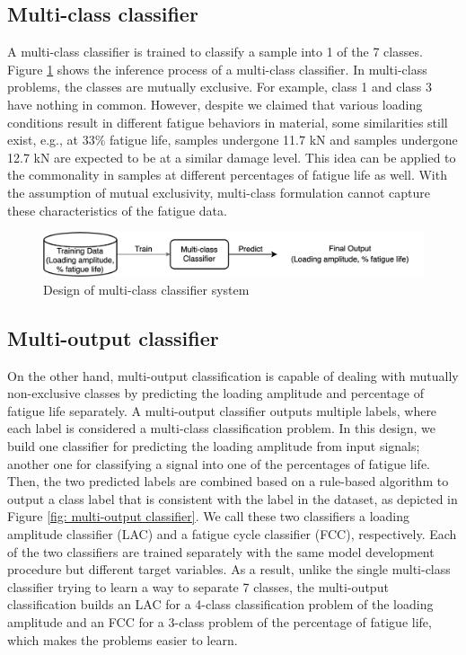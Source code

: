 \subsection{Multi-class classifier}
A multi-class classifier is trained to classify a sample into 1 of the 7 classes. Figure \ref{fig: multi-class classifier} shows the inference process of a multi-class classifier. In multi-class problems, the classes are mutually exclusive. For example, class 1 and class 3 have nothing in common. However, despite we claimed that various loading conditions result in different fatigue behaviors in material, some similarities still exist, e.g., at 33\% fatigue life, samples undergone 11.7 kN and samples undergone 12.7 kN are expected to be at a similar damage level. This idea can be applied to the commonality in samples at different percentages of fatigue life as well. With the assumption of mutual exclusivity, multi-class formulation cannot capture these characteristics of the fatigue data.

\begin{figure}[tb]
    \centering
    \includegraphics[width=0.9\linewidth]{fig/multi-class_classifier.png}
    \caption{Design of multi-class classifier system}
    \label{fig: multi-class classifier}
\end{figure}

\subsection{Multi-output classifier}
\label{subsec: multi-output classifier}
On the other hand, multi-output classification is capable of dealing with mutually non-exclusive classes by predicting the loading amplitude and percentage of fatigue life separately. A multi-output classifier outputs multiple labels, where each label is considered a multi-class classification problem. In this design, we build one classifier for predicting the loading amplitude from input signals; another one for classifying a signal into one of the percentages of fatigue life. Then, the two predicted labels are combined based on a rule-based algorithm to output a class label that is consistent with the label in the dataset, as depicted in Figure \ref{fig: multi-output classifier}. We call these two classifiers a loading amplitude classifier (LAC) and a fatigue cycle classifier (FCC), respectively. Each of the two classifiers are trained separately with the same model development procedure but different target variables. As a result, unlike the single multi-class classifier trying to learn a way to separate 7 classes, the multi-output classification builds an LAC for a 4-class classification problem of the loading amplitude and an FCC for a 3-class problem of the percentage of fatigue life, which makes the problems easier to learn.

